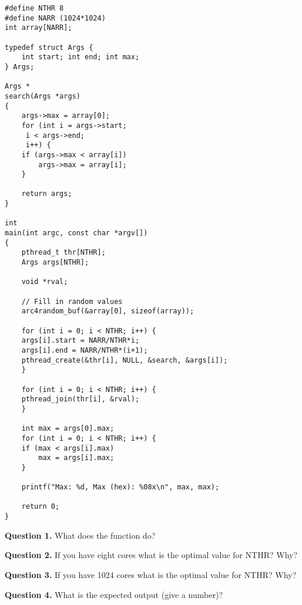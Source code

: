 \documentclass[letterpaper,twocolumn,10pt]{article}
\begin{document}
\begin{lstlisting}[style=CStyle]
#define NTHR 8
#define NARR (1024*1024)
int array[NARR];

typedef struct Args {
    int start; int end; int max;
} Args;

Args *
search(Args *args)
{
    args->max = array[0];
    for (int i = args->start;
	 i < args->end;
	 i++) {
	if (args->max < array[i])
	    args->max = array[i];
    }

    return args;
}

int
main(int argc, const char *argv[])
{
    pthread_t thr[NTHR];
    Args args[NTHR];
    
    void *rval;

    // Fill in random values
    arc4random_buf(&array[0], sizeof(array));

    for (int i = 0; i < NTHR; i++) {
	args[i].start = NARR/NTHR*i;
	args[i].end = NARR/NTHR*(i+1);
	pthread_create(&thr[i], NULL, &search, &args[i]);
    }

    for (int i = 0; i < NTHR; i++) {
	pthread_join(thr[i], &rval);
    }

    int max = args[0].max;
    for (int i = 0; i < NTHR; i++) {
	if (max < args[i].max)
	    max = args[i].max;
    }

    printf("Max: %d, Max (hex): %08x\n", max, max);

    return 0;
}
\end{lstlisting}

\break

\noindent
\textbf{Question 1.} What does the function do?

\vspace{12em}

\noindent
\textbf{Question 2.} If you have eight cores what is the optimal value for 
NTHR? Why?

\vspace{12em}

\noindent
\textbf{Question 3.} If you have 1024 cores what is the optimal value for NTHR?  
Why?

\vspace{12em}
\noindent
\textbf{Question 4.} What is the expected output (give a number)?

\vspace{12em}
\end{document}
